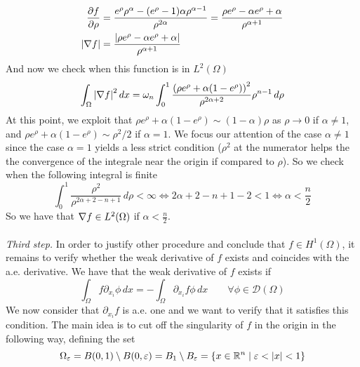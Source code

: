 \begin{align*}
    \frac{\partial f}{\partial \rho} & = \frac{e^\rho \rho^\alpha - (e^\rho - 1) \alpha \rho^{\alpha-1}}{\rho^{2\alpha}} = \frac{\rho e^\rho - \alpha e^\rho + \alpha}{\rho^{\alpha+1}} \\
    \abs{\nabla f}                    & = \frac{\abs{\rho e^{\rho} - \alpha e^{\rho} + \alpha}}{\rho^{\alpha + 1}}
\end{align*}
And now we check when this function is in \(L^2(\Omega)\)
\begin{align*}
    \int_\Omega \abs{\nabla f}^2 \, dx = \omega_n \int_0^1 \frac{\left(\rho e^{\rho} + \alpha (1 - e^{\rho})\right)^2}{\rho^{2\alpha + 2}} \rho^{n-1} \, d\rho \\
\end{align*}
At this point, we exploit that $\rho e^{\rho} + \alpha (1 - e^{\rho}) \sim (1-\alpha)\rho$ as $\rho \to 0$ if $\alpha \neq 1$, and $\rho e^{\rho} + \alpha (1 - e^{\rho}) \sim \rho^2/2$ if $\alpha = 1$.
We focus our attention of the case \(\alpha \neq 1\) since the case \(\alpha = 1\) yields a less strict condition
($\rho^2$ at the numerator helps the the convergence of the integrale near the origin if compared to $\rho$).
So we check when the following integral is finite
\begin{equation*}
    \int_0^1 \frac{\rho^2}{\rho^{2\alpha + 2 - n + 1}} \, d\rho < \infty \iff 2\alpha + 2 - n + 1 - 2 < 1 \iff \alpha < \frac{n}{2}
\end{equation*}
So we have that \(\nabla f \in L^2(\Omega)\) if \(\alpha < \frac{n}{2}\).\\
\vspace{0.1cm}\\
\textit{Third step.} In order to justify other procedure and conclude that $f \in H^1(\Omega)$,
it remains to verify whether the weak derivative of \(f\) exists and coincides with the a.e. derivative.
We have that the weak derivative of \(f\) exists if
\begin{equation}\label{eq:weak_derivative}
    \int_\Omega f \partial_{x_i} \phi \, dx = - \int_\Omega \partial_{x_i} f \phi \, dx \qquad \forall \phi \in \mathcal{D}(\Omega)
\end{equation}
We now consider that $\partial_{x_i} f$ is a.e. one and we want to verify that it satisfies this condition.
The main idea is to cut off the singularity of \(f\) in the origin in the following way, defining the set
\[
    \Omega_\varepsilon = B(0, 1) \setminus B(0, \varepsilon) = B_1 \setminus B_\varepsilon = \left\{ x \in \mathbb{R}^n \mid \varepsilon < \abs{x} < 1 \right\}
\]
